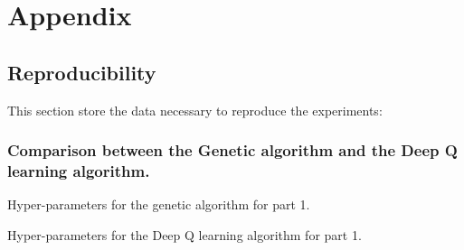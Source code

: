 \documentclass[11pt,a4paper]{article}
\begin{document}
\newpage
\section*{Appendix}
\subsection*{Reproducibility}
This section store the data necessary to reproduce the experiments: \subsubsection*{Comparison between the Genetic algorithm and the Deep Q learning algorithm.}
Hyper-parameters for the genetic algorithm for part 1.
\begin{mybox}
    \tiny{
}
\end{mybox}
\label{Hyperparameters}
Hyper-parameters for the Deep Q learning algorithm for part 1.
\begin{mybox}
    \tiny{
}
\end{mybox}
\end{document}
